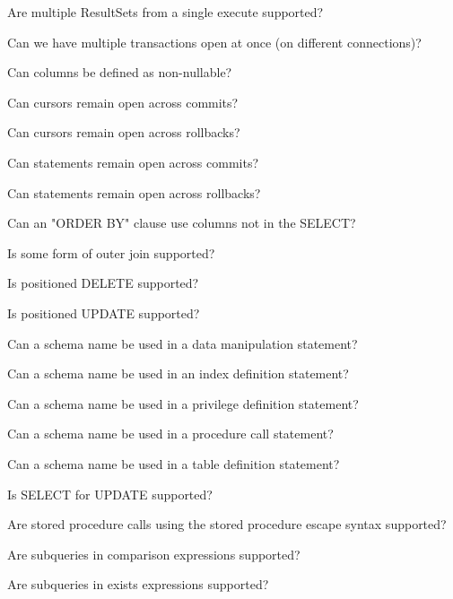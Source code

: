 \begin{description}
Are multiple ResultSets from a single execute supported? 

Can we have multiple transactions open at once (on different connections)? 

Can columns be defined as non-nullable?

Can cursors remain open across commits? 

Can cursors remain open across rollbacks? 

Can statements remain open across commits? 

Can statements remain open across rollbacks? 

Can an "ORDER BY" clause use columns not in the SELECT? 

Is some form of outer join supported? 

Is positioned DELETE supported? 

Is positioned UPDATE supported? 

Can a schema name be used in a data manipulation statement? 

Can a schema name be used in an index definition statement? 

Can a schema name be used in a privilege definition statement? 

Can a schema name be used in a procedure call statement? 

Can a schema name be used in a table definition statement? 

Is SELECT for UPDATE supported? 

Are stored procedure calls using the stored procedure escape syntax supported? 

Are subqueries in comparison expressions supported? 

Are subqueries in exists expressions supported? 


\end{description}
